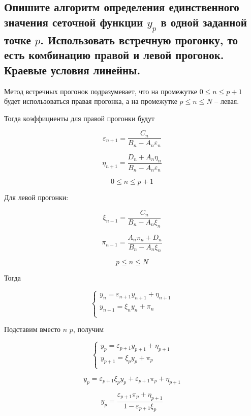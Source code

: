 \subsection{Опишите алгоритм определения единственного значения сеточной функции $y_p$ в одной заданной точке $p$. Использовать встречную прогонку, то есть комбинацию правой и левой прогонок. Краевые условия линейны.}

Метод встречных прогонок подразумевает, что на промежутке $0 \le n \le p + 1$ будет использоваться правая прогонка, а на промежутке $p \le n \le N$ -- левая.

Тогда коэффициенты для правой прогонки будут

\begin{equation*}
    \varepsilon_{n+1} = \frac{C_n}{B_n-A_n\varepsilon_n}
\end{equation*}

\begin{equation*}
    \eta_{n+1} = \frac{D_n + A_n \eta_n}{B_n - A_n \varepsilon_n}
\end{equation*}

\begin{equation*}
    0 \le n \le p+1
\end{equation*}

Для левой прогонки:

\begin{equation*}
    \xi_{n-1} = \frac{C_n}{B_n - A_n \xi_n}
\end{equation*}

\begin{equation*}
    \pi_{n-1} = \frac{A_n\pi_n + D_n}{B_n - A_n\xi_n}
\end{equation*}

\begin{equation*}
    p \le n \le N
\end{equation*}

Тогда

\begin{equation*}
    \begin{cases}
        y_n = \varepsilon_{n+1}y_{n+1}+\eta_{n+1} \\
        y_{n+1} = \xi_{n}y_{n} + \pi_{n} \\
    \end{cases}
\end{equation*}

Подставим вместо $n$ $p$, получим

\begin{equation*}
    \begin{cases}
        y_p = \varepsilon_{p+1}y_{p+1}+\eta_{p+1} \\
        y_{p+1} = \xi_{p}y_{p} + \pi_{p} \\
    \end{cases}
\end{equation*}

\begin{equation*}
    y_p = \varepsilon_{p+1}\xi_py_p + \varepsilon_{p+1}\pi_p + \eta_{p+1}
\end{equation*}

\begin{equation*}
    y_p = \frac{\varepsilon_{p+1}\pi_p + \eta_{p+1}}{1 - \varepsilon_{p+1}\xi_{p}}
\end{equation*}
